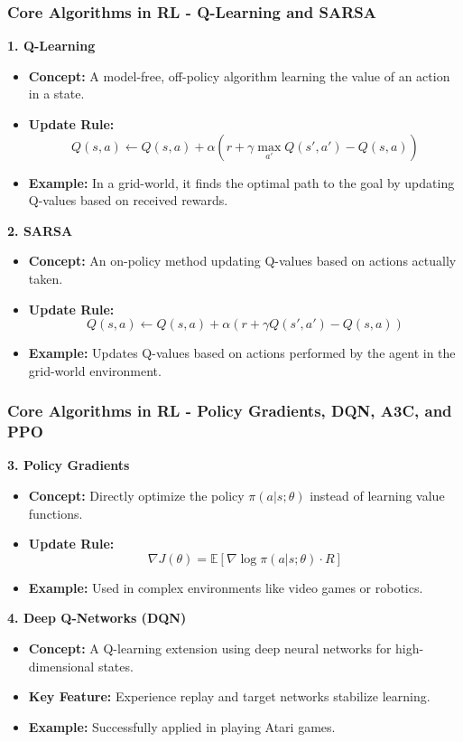 \documentclass{beamer}
\begin{document}
\begin{frame}[fragile]
    \frametitle{Core Algorithms in RL - Q-Learning and SARSA}
    \textbf{1. Q-Learning}
    \begin{itemize}
        \item \textbf{Concept:} A model-free, off-policy algorithm learning the value of an action in a state.
        \item \textbf{Update Rule:}
        \begin{equation}
            Q(s, a) \gets Q(s, a) + \alpha \left( r + \gamma \max_{a'} Q(s', a') - Q(s, a) \right)
        \end{equation}
        \item \textbf{Example:} In a grid-world, it finds the optimal path to the goal by updating Q-values based on received rewards.
    \end{itemize}
    
    \textbf{2. SARSA}
    \begin{itemize}
        \item \textbf{Concept:} An on-policy method updating Q-values based on actions actually taken.
        \item \textbf{Update Rule:}
        \begin{equation}
            Q(s, a) \gets Q(s, a) + \alpha \left( r + \gamma Q(s', a') - Q(s, a) \right)
        \end{equation}
        \item \textbf{Example:} Updates Q-values based on actions performed by the agent in the grid-world environment.
    \end{itemize}
\end{frame}

\begin{frame}[fragile]
    \frametitle{Core Algorithms in RL - Policy Gradients, DQN, A3C, and PPO}
    \textbf{3. Policy Gradients}
    \begin{itemize}
        \item \textbf{Concept:} Directly optimize the policy $\pi(a|s; \theta)$ instead of learning value functions.
        \item \textbf{Update Rule:}
        \begin{equation}
            \nabla J(\theta) = \mathbb{E}[\nabla \log \pi(a|s; \theta) \cdot R]
        \end{equation}
        \item \textbf{Example:} Used in complex environments like video games or robotics.
    \end{itemize}
    
    \textbf{4. Deep Q-Networks (DQN)}
    \begin{itemize}
        \item \textbf{Concept:} A Q-learning extension using deep neural networks for high-dimensional states.
        \item \textbf{Key Feature:} Experience replay and target networks stabilize learning.
        \item \textbf{Example:} Successfully applied in playing Atari games.
    \end{itemize}
\end{frame}
\end{document}
